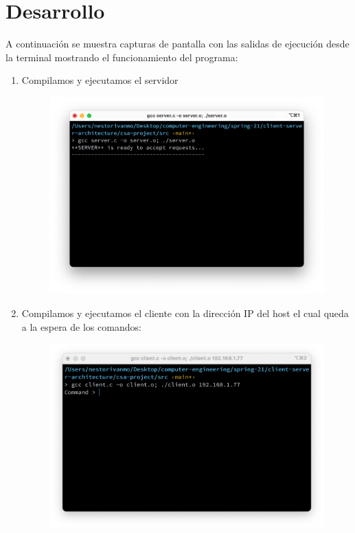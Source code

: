 \documentclass{article}
\begin{document}
\section{Desarrollo}

A continuación se muestra capturas de pantalla con las salidas de ejecución desde la terminal mostrando el funcionamiento del programa:

\begin{enumerate}
    \item Compilamos y ejecutamos el servidor
    	\begin{figure}[H]
		    \centering
		    \includegraphics[scale=0.4]{imgs/server.png}
		\end{figure}
    \item Compilamos y ejecutamos el cliente con la dirección IP del host el cual queda a la espera de los comandos:
    	\begin{figure}[H]
		    \centering
		    \includegraphics[scale=0.4]{imgs/client_initial.png}

\end{figure}
\end{enumerate}
\end{document}
